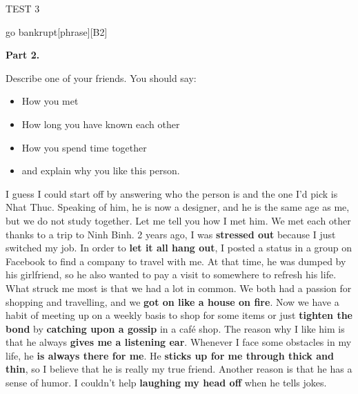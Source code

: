 \begin{glossarymc}[Cambridge 5]
\begin{test}{TEST 3}
\begin{VocabExplain}[Part 1]
            \begin{ExplainCard}{go bankrupt}[phrase][B2]
            \end{ExplainCard}
        \end{VocabExplain}

    \noindent
    \textbf{Part 2.}

    \begin{qa}{Describe one of your friends. You should say:}
        \begin{itemize}
        \item How you met
        \item How long you have known each other
        \item How you spend time together
        \item and explain why you like this person.
        \end{itemize}

       I guess I could start off by answering who the person is and the one I'd pick is Nhat Thuc. Speaking of him, he is now a designer, and he is the same age as me, but we do not study together. Let me tell you how I met him. We met each other thanks to a trip to Ninh Binh. 2 years ago, I was \textbf{stressed out} because I just switched my job. In order to \textbf{let it all hang out}, I posted a status in a group on Facebook to find a company to travel with me. At that time, he was dumped by his girlfriend, so he also wanted to pay a visit to somewhere to refresh his life. What struck me most is that we had a lot in common. We both had a passion for shopping and travelling, and we \textbf{got on like a house on fire}. Now we have a habit of meeting up on a weekly basis to shop for some items or just \textbf{tighten the bond} by \textbf{catching upon a gossip} in a café shop. The reason why I like him is that he always \textbf{gives me a listening ear}. Whenever I face some obstacles in my life, he \textbf{is always there for me}. He \textbf{sticks up for me through thick and thin}, so I believe that he is really my true friend. Another reason is that he has a sense of humor. I couldn't help \textbf{laughing my head off} when he tells jokes.
        \end{qa}


\end{test}
\end{glossarymc}
